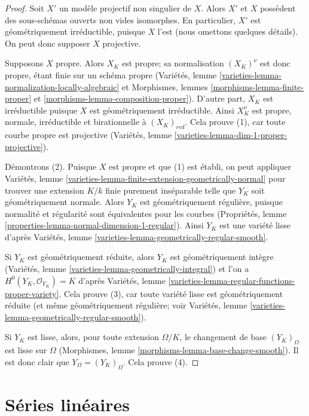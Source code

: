 \begin{proof}
Soit $X'$ un modèle projectif non singulier de $X$. Alors $X'$ et $X$ possèdent des sous-schémas ouverts non vides isomorphes. En particulier, $X'$ est géométriquement irréductible, puisque $X$ l'est (nous omettons quelques détails). On peut donc supposer $X$ projective.

\medskip\noindent
Supposons $X$ propre. Alors $X_K$ est propre; sa normalisation $(X_K)^\nu$ est donc propre, étant finie sur un schéma propre (Variétés, lemme \ref{varieties-lemma-normalization-locally-algebraic} et Morphismes, lemmes \ref{morphisms-lemma-finite-proper} et \ref{morphisms-lemma-composition-proper}). D'autre part, $X_K$ est irréductible puisque $X$ est géométriquement irréductible. Ainsi $X_K^\nu$ est propre, normale, irréductible et birationnelle à $(X_K)_{red}$. Cela prouve (1), car toute courbe propre est projective (Variétés, lemme \ref{varieties-lemma-dim-1-proper-projective}).

\medskip\noindent
Démontrons (2). Puisque $X$ est propre et que (1) est établi, on peut appliquer Variétés, lemme \ref{varieties-lemma-finite-extension-geometrically-normal} pour trouver une extension $K/k$ finie purement inséparable telle que $Y_K$ soit géométriquement normale. Alors $Y_K$ est géométriquement régulière, puisque normalité et régularité sont équivalentes pour les courbes (Propriétés, lemme \ref{properties-lemma-normal-dimension-1-regular}). Ainsi $Y_K$ est une variété lisse d'après Variétés, lemme \ref{varieties-lemma-geometrically-regular-smooth}.

\medskip\noindent
Si $Y_K$ est géométriquement réduite, alors $Y_K$ est géométriquement intègre (Variétés, lemme \ref{varieties-lemma-geometrically-integral}) et l'on a $H^0(Y_K, \mathcal{O}_{Y_K}) = K$ d'après Variétés, lemme \ref{varieties-lemma-regular-functions-proper-variety}. Cela prouve (3), car toute variété lisse est géométriquement réduite (et même géométriquement régulière; voir Variétés, lemme \ref{varieties-lemma-geometrically-regular-smooth}).

\medskip\noindent
Si $Y_K$ est lisse, alors, pour toute extension $\Omega/K$, le changement de base $(Y_K)_\Omega$ est lisse sur $\Omega$ (Morphismes, lemme \ref{morphisms-lemma-base-change-smooth}). Il est donc clair que $Y_\Omega = (Y_K)_\Omega$. Cela prouve (4).
\end{proof}






\section{Séries linéaires}
\label{section-linear-series}

